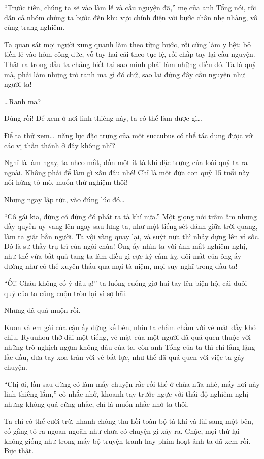 \documentclass[../main.tex]{subfiles}
\begin{document}
``Trước tiên, chúng ta sẽ vào làm lễ và cầu nguyện đã,'' mẹ của anh Tổng nói, rồi dẫn cả nhóm chúng ta bước đến khu vực chính điện với bước chân nhẹ nhàng, vô cùng trang nghiêm.

Ta quan sát mọi người xung quanh làm theo từng bước, rồi cũng làm y hệt: bỏ tiền lẻ vào hòm công đức, vỗ tay hai cái theo tục lệ, rồi chắp tay lại cầu nguyện. Thật ra trong đầu ta chẳng biết tại sao mình phải làm những điều đó. Ta là quỷ mà, phải làm những trò ranh ma gì đó chứ, sao lại đứng đây cầu nguyện như người ta!

\dots Ranh ma?

Đúng rồi! Để xem ở nơi linh thiêng này, ta có thể làm được gì\dots

Để ta thử xem\dots\ năng lực đặc trưng của một succubus có thể tác dụng được với các vị thần thánh ở đây không nhỉ?

Nghĩ là làm ngay, ta nheo mắt, dồn một ít tà khí đặc trưng của loài quỷ ta ra ngoài. Không phải để làm gì xấu đâu nhé! Chỉ là một đứa con quỷ 15 tuổi này nổi hứng tò mò, muốn thử nghiệm thôi!

Nhưng ngay lập tức, vào đúng lúc đó\dots

``Cô gái kia, đừng có đứng đó phát ra tà khí nữa.'' Một giọng nói trầm ấm nhưng đầy quyền uy vang lên ngay sau lưng ta, như một tiếng sét đánh giữa trời quang, làm ta giật bắn người. Ta vội vàng quay lại, và suýt nữa thì nhảy dựng lên vì sốc. Đó là sư thầy trụ trì của ngôi chùa! Ông ấy nhìn ta với ánh mắt nghiêm nghị, như thể vừa bắt quả tang ta làm điều gì cực kỳ cấm kỵ, đôi mắt của ông ấy dường như có thể xuyên thấu qua mọi tà niệm, mọi suy nghĩ trong đầu ta!

``Ối! Cháu không cố ý đâu ạ!'' ta luống cuống giơ hai tay lên biện hộ, cái đuôi quỷ của ta cũng cuộn tròn lại vì sợ hãi.

Nhưng đã quá muộn rồi.

Kuon và em gái của cậu ấy đứng kế bên, nhìn ta chằm chằm với vẻ mặt đầy khó chịu. Ryuuhou thở dài một tiếng, vẻ mặt của một người đã quá quen thuộc với những trò nghịch ngợm không đâu của ta, còn anh Tổng của ta thì chỉ lẳng lặng lắc đầu, đưa tay xoa trán với vẻ bất lực, như thể đã quá quen với việc ta gây chuyện.

``Chị ơi, lần sau đừng có làm mấy chuyện rắc rối thế ở chùa nữa nhé, mấy nơi này linh thiêng lắm,'' cô nhắc nhở, khoanh tay trước ngực với thái độ nghiêm nghị nhưng không quá cứng nhắc, chỉ là muốn nhắc nhở ta thôi.

Ta chỉ có thể cười trừ, nhanh chóng thu hồi toàn bộ tà khí và lùi sang một bên, cố gắng tỏ ra ngoan ngoãn như chưa có chuyện gì xảy ra. Chậc, mọi thứ lại không giống như trong mấy bộ truyện tranh hay phim hoạt ảnh ta đã xem rồi. Bực thật.
\end{document}
